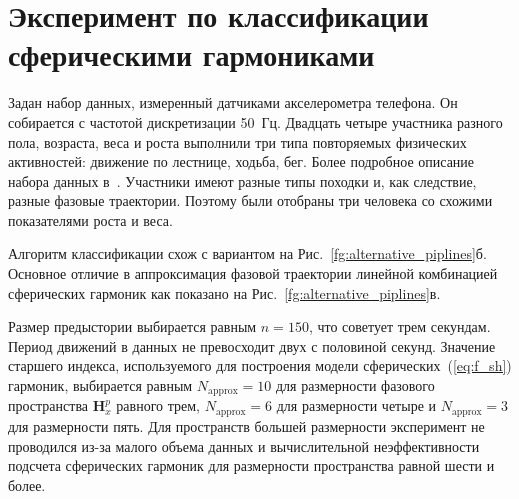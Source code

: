 \documentclass[12pt,twoside]{article}
\begin{document}




\section{Эксперимент по классификации сферическими гармониками}
Задан набор данных, измеренный датчиками акселерометра телефона.
Он собирается с частотой дискретизации 50~Гц.
Двадцать четыре участника разного пола, возраста, веса и роста выполнили три типа повторяемых физических активностей: движение по лестнице, ходьба, бег.
Более подробное описание набора данных в~\cite{Malekzadeh_2018}.
Участники имеют разные типы походки и, как следствие, разные фазовые траектории.
Поэтому были отобраны три человека со схожими показателями роста и веса.

Алгоритм классификации схож с вариантом на Рис.~\ref{fg:alternative_piplines}б. Основное отличие в аппроксимация фазовой траектории линейной комбинацией сферических гармоник как показано на Рис.~\ref{fg:alternative_piplines}в.

Размер предыстории выбирается равным $n = 150$, что советует трем секундам.
Период движений в данных не превосходит двух с половиной секунд.
Значение старшего индекса, используемого для построения модели сферических~(\ref{eq:f_sh}) гармоник, выбирается равным $N_{\text{approx}} = 10$ для размерности фазового пространства $\mathbf{H}_{x}^{p}$ равного трем, $N_{\text{approx}} = 6$ для размерности четыре и $N_{\text{approx}} = 3$ для размерности пять.
Для пространств большей размерности эксперимент не проводился из-за малого объема данных и  вычислительной неэффективности подсчета сферических гармоник для размерности пространства равной шести и более.
\end{document}
